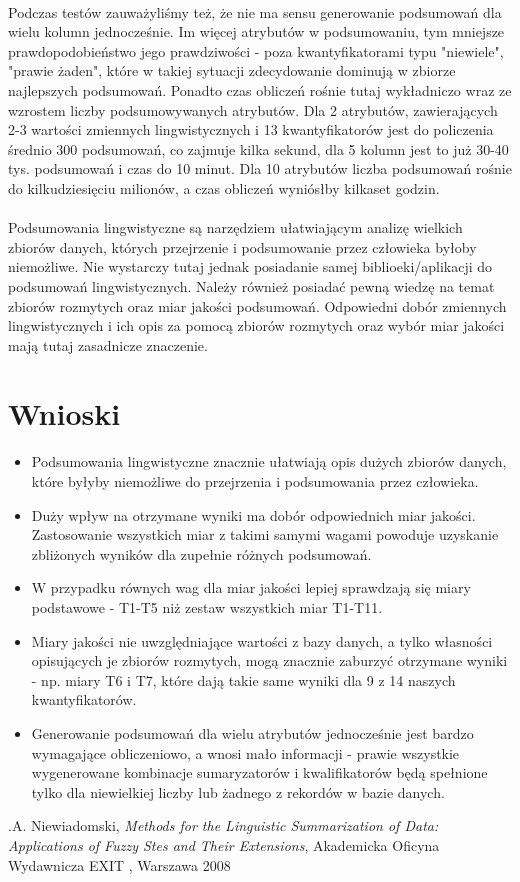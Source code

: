 \documentclass{classrep}
\begin{document}
\paragraph{}
Podczas testów zauważyliśmy też, że nie ma sensu generowanie podsumowań dla wielu kolumn jednocześnie. Im więcej atrybutów w podsumowaniu, tym mniejsze prawdopodobieństwo jego prawdziwości - poza kwantyfikatorami typu "niewiele", "prawie żaden", które w takiej sytuacji zdecydowanie dominują w zbiorze najlepszych podsumowań. Ponadto czas obliczeń rośnie tutaj wykładniczo wraz ze wzrostem liczby podsumowywanych atrybutów. Dla 2 atrybutów, zawierających 2-3 wartości zmiennych lingwistycznych i 13 kwantyfikatorów jest do policzenia średnio 300 podsumowań, co zajmuje kilka sekund, dla 5 kolumn jest to już 30-40 tys. podsumowań i czas do 10 minut. Dla 10 atrybutów liczba podsumowań rośnie do kilkudziesięciu milionów, a czas obliczeń wyniósłby kilkaset godzin.

\paragraph{}
Podsumowania lingwistyczne są narzędziem ułatwiającym analizę wielkich zbiorów danych, których przejrzenie i podsumowanie przez człowieka byłoby niemożliwe. Nie wystarczy tutaj jednak posiadanie samej biblioeki/aplikacji do podsumowań lingwistycznych. Należy również posiadać pewną wiedzę na temat zbiorów rozmytych oraz miar jakości podsumowań. Odpowiedni dobór zmiennych lingwistycznych i ich opis za pomocą zbiorów rozmytych oraz wybór miar jakości mają tutaj zasadnicze znaczenie.


\section{Wnioski}
\begin{itemize}
 \item Podsumowania lingwistyczne znacznie ułatwiają opis dużych zbiorów danych, które byłyby niemożliwe do przejrzenia i podsumowania przez człowieka.
 \item Duży wpływ na otrzymane wyniki ma dobór odpowiednich miar jakości. Zastosowanie wszystkich miar z takimi samymi wagami powoduje uzyskanie zbliżonych wyników dla zupełnie różnych podsumowań.
 \item W przypadku równych wag dla miar jakości lepiej sprawdzają się miary podstawowe - T1-T5 niż zestaw wszystkich miar T1-T11.
 \item Miary jakości nie uwzględniające wartości z bazy danych, a tylko własności opisujących je zbiorów rozmytych, mogą znacznie zaburzyć otrzymane wyniki - np. miary T6 i T7, które dają takie same wyniki dla 9 z 14 naszych kwantyfikatorów.
 \item Generowanie podsumowań dla wielu atrybutów jednocześnie jest bardzo wymagające obliczeniowo, a wnosi mało informacji - prawie wszystkie wygenerowane kombinacje sumaryzatorów i kwalifikatorów będą spełnione tylko dla niewielkiej liczby lub żadnego z rekordów w bazie danych.
\end{itemize}

\begin{thebibliography}{0}
\bibitem .A. Niewiadomski, \textsl{Methods for the Linguistic Summarization of Data: Applications of Fuzzy Stes and Their Extensions}, Akademicka Oficyna Wydawnicza EXIT , Warszawa 2008
	
\end{thebibliography}
\end{document}
